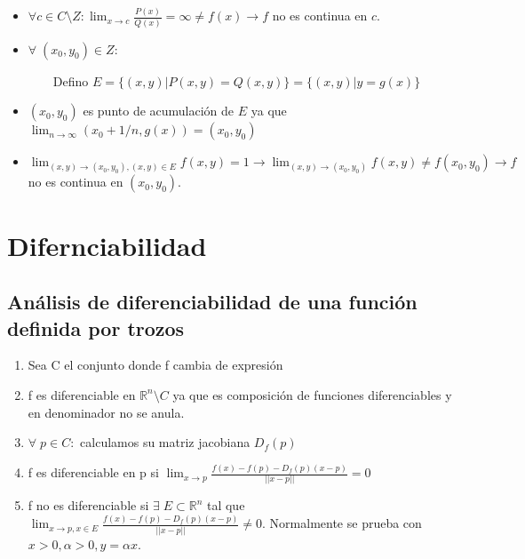 \documentclass[twoside]{article}
\newcommand{\R}{\mathbb{R}}
\newcommand{\s}{\hspace{20pt}}
\newcommand{\all}{\forall \;}
\newcommand{\ex}{\exists \;}
\newcommand{\m}{\setminus}
\newcommand{\dlim}{\displaystyle\lim}
\begin{document}
\begin{itemize}
\begin{itemize}
\begin{itemize}
\item $\forall c \in C \m Z: \dlim_{x\rightarrow c} \frac{P(x)}{Q(x)} = \infty \neq f(x) \rightarrow f$ no es continua en $c$. 

\item $\all (x_0,y_0) \in Z:$

$\s$ Defino $E= \{(x,y) | P(x,y) = Q(x,y) \} = \{(x,y) | y = g(x) \}$

\item $(x_0,y_0)$ es punto de acumulación de $E$ ya que $\dlim_{n \rightarrow \infty} (x_0 + 1/n, g(x)) = (x_0,y_0)$

\item $\dlim_{(x,y) \rightarrow (x_0,y_0), (x,y) \in E} f(x,y) = 1 \rightarrow \dlim_{(x,y) \rightarrow (x_0,y_0)} f(x,y) \neq f(x_0,y_0) \rightarrow f$ no es continua en $(x_0,y_0)$.
  
\end{itemize}
\end{itemize}
\end{itemize}

\section{Difernciabilidad}

\subsection{Análisis de diferenciabilidad de una función definida por trozos}

\begin{enumerate}

\item Sea C el conjunto donde f cambia de expresión

\item f es diferenciable en $\R^n \m C$ ya que es composición de funciones diferenciables y en denominador no se anula.

\item $\all p \in C:$ calculamos su matriz jacobiana $D_f(p)$

\item f es diferenciable en p si $ \dlim_{x \rightarrow p} \frac{f(x)-f(p)-D_f(p)(x-p)}{||x-p||} = 0$

\item f no es diferenciable si $\ex E \subset \R^n$ tal que $ \dlim_{x \rightarrow p, x \in E} \frac{f(x)-f(p)-D_f(p)(x-p)}{||x-p||} \neq 0$. Normalmente se prueba con $x > 0, \alpha > 0, y = \alpha x$.
\end{enumerate}
\end{document}
